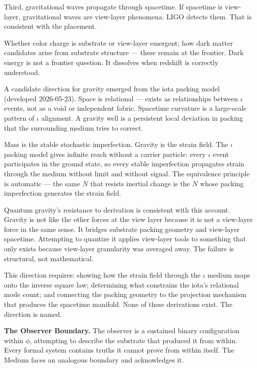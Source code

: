 \documentclass[11pt,letterpaper]{article}
\begin{document}
Third, gravitational waves propagate through spacetime. If spacetime is view-layer, gravitational waves are view-layer phenomena. LIGO detects them. That is consistent with the placement.

Whether color charge is substrate or view-layer emergent; how dark matter candidates arise from substrate structure --- these remain at the frontier. Dark energy is not a frontier question. It dissolves when redshift is correctly understood.

A candidate direction for gravity emerged from the iota packing model (developed 2026-05-23). Space is relational --- exists as relationships between \(\iota\) events, not as a void or independent fabric. Spacetime curvature is a large-scale pattern of \(\iota\) alignment. A gravity well is a persistent local deviation in packing that the surrounding medium tries to correct.

Mass is the stable stochastic imperfection. Gravity is the strain field. The \(\iota\) packing model gives infinite reach without a carrier particle: every \(\iota\) event participates in the ground state, so every stable imperfection propagates strain through the medium without limit and without signal. The equivalence principle is automatic --- the same \(N\) that resists inertial change is the \(N\) whose packing imperfection generates the strain field.

Quantum gravity's resistance to derivation is consistent with this account. Gravity is not like the other forces at the view layer because it is not a view-layer force in the same sense. It bridges substrate packing geometry and view-layer spacetime. Attempting to quantize it applies view-layer tools to something that only exists because view-layer granularity was averaged away. The failure is structural, not mathematical.

This direction requires: showing how the strain field through the \(\iota\) medium maps onto the inverse square law; determining what constrains the iota's relational mode count; and connecting the packing geometry to the projection mechanism that produces the spacetime manifold. None of these derivations exist. The direction is named.

\textbf{The Observer Boundary.} The observer is a sustained binary configuration within \(\phi\), attempting to describe the substrate that produced it from within. Every formal system contains truths it cannot prove from within itself. The Medium faces an analogous boundary and acknowledges it.
\end{document}
